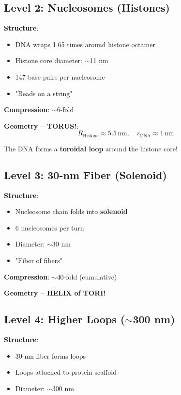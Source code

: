 	\subsection{Level 2: Nucleosomes (Histones)}
	
	\textbf{Structure}:
	\begin{itemize}
		\item DNA wraps 1.65 times around histone octamer
		\item Histone core diameter: $\sim$11 nm
		\item 147 base pairs per nucleosome
		\item "Beads on a string"
	\end{itemize}
	
	\textbf{Compression}: $\sim$6-fold
	
	\textbf{Geometry -- TORUS!}:
	\begin{equation}
		R_{\text{Histone}} \approx 5.5\,\text{nm}, \quad r_{\text{DNA}} \approx 1\,\text{nm}
	\end{equation}
	
	The DNA forms a \textbf{toroidal loop} around the histone core!
	
	\subsection{Level 3: 30-nm Fiber (Solenoid)}
	
	\textbf{Structure}:
	\begin{itemize}
		\item Nucleosome chain folds into \textbf{solenoid}
		\item 6 nucleosomes per turn
		\item Diameter: $\sim$30 nm
		\item "Fiber of fibers"
	\end{itemize}
	
	\textbf{Compression}: $\sim$40-fold (cumulative)
	
	\textbf{Geometry -- HELIX of TORI!}
	
	\subsection{Level 4: Higher Loops ($\sim$300 nm)}
	
	\textbf{Structure}:
	\begin{itemize}
		\item 30-nm fiber forms loops
		\item Loops attached to protein scaffold
		\item Diameter: $\sim$300 nm
	\end{itemize}
	
